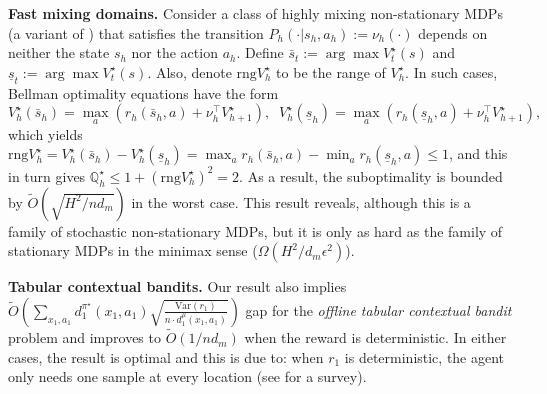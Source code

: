 \textbf{Fast mixing domains.} Consider a class of highly mixing non-stationary MDPs (a variant of \cite{zanette2018problem}) that satisfies the transition $P_h(\cdot|s_h,a_h):=\nu_h(\cdot)$ depends on neither the state $s_h$ nor the action $a_h$. Define $\bar{s}_{t} := \arg \max V_{t}^{\star}(s)$ and $\underline{s}_{t} := \arg \max V_{t}^{\star}(s)$. Also, denote $\mathrm{rng}V^\star_h$ to be the range of $V^\star_h$.
In such cases, Bellman optimality equations have the form
{
\[
V_{h}^{\star}\left(\bar{s}_{h}\right)=\max _{a}\left(r_h\left(\bar{s}_{h}, a\right)+\nu_h^{\top} V_{h+1}^{\star}\right),\;\;V_{h}^{\star}\left(\underline{s}_{h}\right)=\max _{a}\left(r_h\left(\underline{s}_{h}, a\right)+\nu_h^{\top} V_{h+1}^{\star}\right),
\]
}which yields $\mathrm{rng}V^\star_h=V_{h}^{\star}\left(\bar{s}_{h}\right)-V_{h}^{\star}\left(\underline{s}_{h}\right)=\max_ar_h\left(\bar{s}_{h}, a\right)-\min_ar_h\left(\underline{s}_{h}, a\right)\leq 1$, and this in turn gives $\mathbb{Q}_h^\star\leq 1+(\mathrm{rng}V^\star_h)^2=2$. As a result, the suboptimality is bounded by $\widetilde{O}(\sqrt{H^2/nd_m})$ in the worst case. This result reveals, although this is a family of stochastic non-stationary MDPs, but it is only as hard as the family of stationary MDPs in the minimax sense ($\Omega(H^2/d_m\epsilon^2)$).

\textbf{Tabular contextual bandits.} Our result also implies $\widetilde{O}(\sum_{x_1,a_1}d^{\pi^\star}_1(x_1,a_1)\sqrt{\frac{\mathrm{Var}{(r_1)}}{n\cdot d^\mu_1(x_1,a_1)}})$ gap for the \emph{offline tabular contextual bandit} problem and improves to $\widetilde{O}(1/nd_m)$ when the reward is deterministic. In either cases, the result is optimal and this is due to: when $r_1$ is deterministic, the agent only needs one sample at every location (see \cite{bubeck2012regret} for a survey).


















